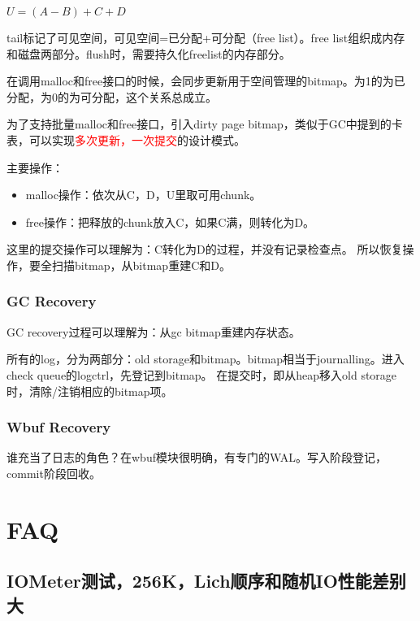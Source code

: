 \documentclass[UTF8]{ctexart}
\begin{document}
 $U = (A - B) + C + D$

tail标记了可见空间，可见空间=已分配+可分配（free list）。free list组织成内存和磁盘两部分。flush时，需要持久化freelist的内存部分。

在调用malloc和free接口的时候，会同步更新用于空间管理的bitmap。为1的为已分配，为0的为可分配，这个关系总成立。

为了支持批量malloc和free接口，引入dirty page bitmap，类似于GC中提到的卡表，可以实现\textcolor{red}{多次更新，一次提交}的设计模式。

主要操作：
\begin{itemize}
    \item malloc操作：依次从C，D，U里取可用chunk。
    \item free操作：把释放的chunk放入C，如果C满，则转化为D。
\end{itemize}

这里的提交操作可以理解为：C转化为D的过程，并没有记录检查点。
所以恢复操作，要全扫描bitmap，从bitmap重建C和D。

\subsubsection{GC Recovery}

GC recovery过程可以理解为：从gc bitmap重建内存状态。

所有的log，分为两部分：old storage和bitmap。bitmap相当于journalling。进入check queue的logctrl，先登记到bitmap。
在提交时，即从heap移入old storage时，清除/注销相应的bitmap项。


\subsubsection{Wbuf Recovery}

谁充当了日志的角色？在wbuf模块很明确，有专门的WAL。写入阶段登记，commit阶段回收。

\section{FAQ}

\subsection{IOMeter测试，256K，Lich顺序和随机IO性能差别大}
\end{document}
